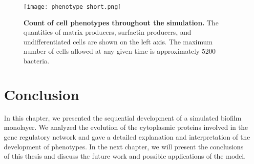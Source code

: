 \begin{figure}[h]
    \centering
    \texttt{[image: phenotype\_short.png]}
    \caption{\footnotesize \textbf{Count of cell phenotypes throughout the simulation.} The quantities of matrix producers, surfactin producers, and undifferentiated cells are shown on the left axis. The maximum number of cells allowed at any given time is approximately 5200 bacteria.}


    
\end{figure} 

 




    
\clearpage



\section{Conclusion}

In this chapter, we presented the sequential development of a simulated biofilm monolayer. We analyzed the evolution of the cytoplasmic proteins involved in the gene regulatory network and gave a detailed explanation and interpretation of the development of phenotypes. In the next chapter, we will present the conclusions of this thesis and discuss the future work and possible applications of the model.
